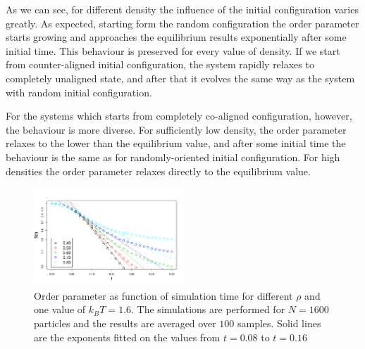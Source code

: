 As we can see, for different density the influence of the initial configuration varies greatly. As expected, starting form the random configuration the order parameter starts growing and approaches the equilibrium results exponentially after some initial time. This behaviour is preserved for every value of density. If we start from counter-aligned initial configuration, the system rapidly relaxes to completely unaligned state, and after that it evolves the same way as the system with random initial configuration.

For the systems which starts from completely co-aligned configuration, however, the behaviour is more diverse. For sufficiently low density, the order parameter relaxes to the lower than the equilibrium value, and after some initial time the behaviour is the same as for randomly-oriented initial configuration. For high densities the order parameter relaxes directly to the equilibrium value.

\begin{figure}[h]
\centering
	\includegraphics[width=0.5\textwidth]{Images/op_relaxation_short_fitting_kbt_1.png}
	\captionsetup{justification=centering, width=0.9\columnwidth}
	\caption{Order parameter as function of simulation time for different $\rho$ and one value of $k_BT = 1.6$. The simulations are performed for $N = 1600$ particles and the results are averaged over $100$ samples. Solid lines are the exponents fitted on the values from $t = 0.08$ to $t = 0.16$}
	\label{fig:short_time_order_parameter_fitting}
\end{figure}

